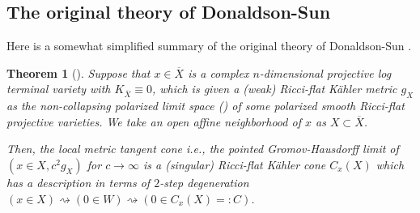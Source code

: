 \documentclass[12pt,a4paper]{amsart}
\newtheorem{Thm}{Theorem}[section]
\theoremstyle{remark}
\theoremstyle{definition}
\begin{document}
\subsection{The original theory of Donaldson-Sun}
Here is a somewhat simplified 
summary of the original theory of Donaldson-Sun 
\cite{DSII}. 

\begin{Thm}[\cite{DSII}]\label{DSII.thm}
Suppose that $x\in \overline{X}$ is a complex $n$-dimensional projective log terminal variety with 
$K_{\overline{X}}\equiv 0$, which is given a (weak) Ricci-flat K\"ahler metric $g_X$
as the non-collapsing polarized limit space (\cite{DS}) of some polarized smooth Ricci-flat projective varieties. We take an open affine neighborhood of $x$ as $X\subset \overline{X}$. 

Then, the local metric tangent cone i.e., 
the pointed Gromov-Hausdorff limit of $(x\in X,c^2 g_X)$ for $c\to \infty$ 
is a (singular) Ricci-flat K\"ahler cone $C_x(X)$ which has a description 
in terms of $2$-step degeneration 
$(x\in X)\rightsquigarrow (0\in W)\rightsquigarrow (0\in C_x(X)=:C)$.  
\end{Thm}
\end{document}
